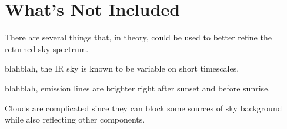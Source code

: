 \documentclass{emulateapj}  %
\begin{document}
\section{What's Not Included}

There are several things that, in theory, could be used to better refine the returned sky spectrum.

blahblah, the IR sky is known to be variable on short timescales.

blahblah, emission lines are brighter right after sunset and before sunrise.

Clouds are complicated since they can block some sources of sky background while also reflecting other components.  



\end{document}
